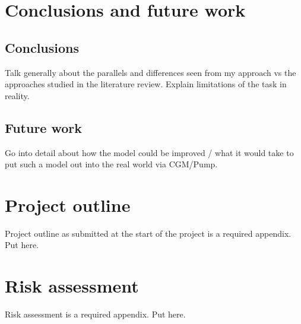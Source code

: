 \section{Conclusions and future work} %
    \subsection{Conclusions}
        Talk generally about the parallels and differences seen from my approach vs the approaches studied in the literature review. Explain limitations of the task in reality.
	
	\subsection{Future work}
        Go into detail about how the model could be improved / what it would take to put such a model out into the real world via CGM/Pump.
    


\printbibliography[title={References},heading=bibintoc] %



\begin{uomappendix} 
    \section{Project outline}
    Project outline as submitted at the start of the project is a required appendix. Put here. 
    
    \section{Risk assessment}
    Risk assessment is a required appendix. Put here.

\end{uomappendix}


